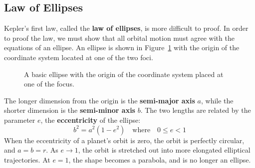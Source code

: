 \subsection{Law of Ellipses}
Kepler's first law, called the \textbf{law of ellipses}, is more difficult to
proof. In order to proof the
law, we must show that all orbital motion must agree with the equations of an
ellipse. An ellipse is shown in Figure~\ref{ellipse1} with the origin of the
coordinate system located at one of the two foci.
\begin{figure}[!ht]
  \centering
  \caption{A basic ellipse with the origin of the coordinate system placed at
    one of the focus.}
  \label{ellipse1}
\end{figure}

The longer dimension from the origin is the \textbf{semi-major axis} $a$, while
the shorter dimension is the \textbf{semi-minor axis} $b$. The two lengths are
related by the parameter $e$, the \textbf{eccentricity} of the ellipse:
\begin{equation}
  b^2=a^2(1-e^2)\quad\text{where}\quad 0\leq e < 1
\end{equation}
When the eccentricity of a planet's orbit is zero, the orbit is perfectly
circular, and $a=b=r$. As $e\to 1$, the orbit is stretched out into
more elongated elliptical trajectories. At $e=1$, the shape becomes a parabola,
and is no longer an ellipse.

